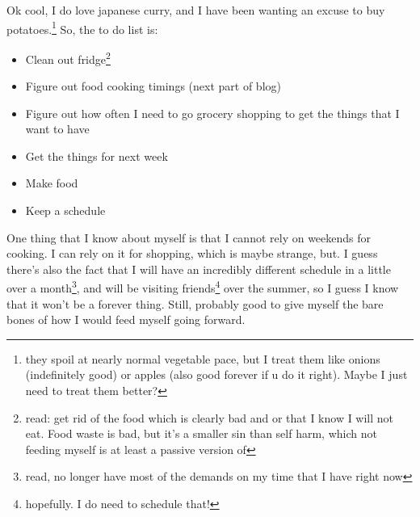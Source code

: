 \documentclass[12pt]{article}[titlepage]
\renewcommand{\,}{\textsuperscript{,}}
\begin{document}
Ok cool, I do love japanese curry, and I have been wanting an excuse to buy potatoes.\footnote{they spoil at nearly normal vegetable pace, but I treat them like onions (indefinitely good) or apples (also good forever if u do it right). Maybe I just need to treat them better?}  
So, the to do list is:  
\begin{itemize}  
\item Clean out fridge\footnote{read: get rid of the food which is clearly bad and or that I know I will not eat. Food waste is bad, but it's a smaller sin than self harm, which not feeding myself is at least a passive version of}  
\item Figure out food cooking timings (next part of blog)  
\item Figure out how often I need to go grocery shopping to get the things that I want to have  
\item Get the things for next week  
\item Make food  
\item Keep a schedule  
\end{itemize}

One thing that I know about myself is that I cannot rely on weekends for cooking.  
I can rely on it for shopping, which is maybe strange, but.  
I guess there's also the fact that I will have an incredibly different schedule in a little over a month\footnote{read, no longer have most of the demands on my time that I have right now}, and will be visiting friends\footnote{hopefully. I do need to schedule that!} over the summer, so I guess I know that it won't be a forever thing.  
Still, probably good to give myself the bare bones of how I would feed myself going forward.
\end{document}
